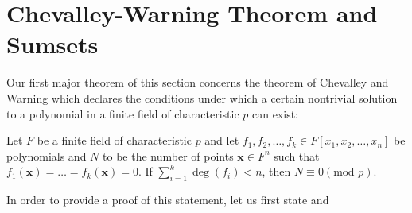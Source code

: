 \chapter{Chevalley-Warning Theorem and Sumsets}  Our first
major theorem of this section concerns the theorem of Chevalley and Warning
which declares the conditions under which a certain nontrivial solution to a
polynomial in a finite field of characteristic $p$ can exist:
\begin{theorem} Let $F$ be a finite field of
	characteristic $p$ and let $f_1, f_2, \ldots, f_k \in F[x_1, x_2,
	\ldots, x_{n}]$ be polynomials and $N$ to be the number of points
	$\textbf{x}\in F^{n}$ such that $f_1\left( \textbf{x} \right) = \ldots
	= f_k \left( \textbf{x} \right)  = 0$. If $ \sum_{i= 1}^{k} \deg \left(
	f_{i} \right)< n$, then $N \equiv 0 (\text{mod } p) $.  \end{theorem}
	In order to provide a proof of this statement, let us first state and
